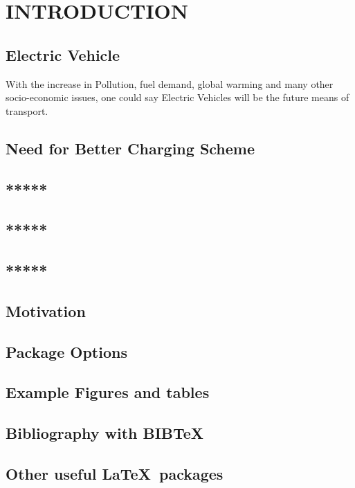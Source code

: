 	\chapter{INTRODUCTION}
	\label{chap:intro}
	
	\section{Electric Vehicle}
	
	With the increase in Pollution, fuel demand, global warming and many other socio-economic issues, one could say Electric Vehicles will be the future means of transport.
	
	
	\section{Need for Better Charging Scheme}
	\section{*****}
	\section{*****}
	\section{*****}
	\section{Motivation}

	
	\section{Package Options}
	

	
	
	\section{Example Figures and tables}
	
	
	\section{Bibliography with BIB\TeX}
	

	
	\section{Other useful \LaTeX\ packages}
	
